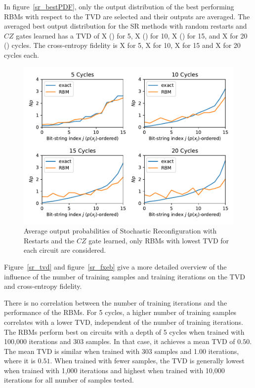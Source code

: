 In figure~\ref{sr_bestPDF}, only the output distribution of the best performing RBMs with respect to the 
TVD are selected and their outputs are averaged. The averaged best output distribution for the SR methods with 
random restarts and $CZ$ gates learned has a TVD of X () for 5, X () for 10, X () for 15, and X for 20 () 
cycles. The cross-entropy fidelity is X for 5, X for 10, X for 15 and X for 20 cycles each. 

\begin{figure}[H]
  \centering
  \includegraphics[width=\textwidth]{figures/results/SR-restarts-learned/avgBestPDF.pdf}
  \caption[Averaged best performing output probabilities of Stochastic Reconfiguration with Restarts Learned]{
    Average output probabilities of Stochastic Reconfiguration with Restarts and the $CZ$ gate learned, only RBMs with lowest
    TVD for each circuit are considered.}
  \label{fig:sr_bestPDF}
\end{figure}

Figure~\ref{sr_tvd} and figure~\ref{sr_fxeb} give a more detailed overview of the influence of the 
number of training samples and training iterations on the TVD and cross-entropy fidelity. 

There is no correlation between the number of training
iterations and the performance of the RBMs. For 5 cycles, a higher number of training samples correlates
with a lower TVD, independent of the number of training iterations. The RBMs perform best on 
circuits with a depth of 5 cycles when trained with 100,000 iterations and 303 samples. In that case, 
it achieves a mean TVD of $0.50$. The mean TVD is similar when trained with 303 samples and 1.00 iterations, 
where it is $0.51$. When trained with fewer samples, the TVD is generally lowest when trained with 1,000 
iterations and highest when trained with 10,000 iterations for all number of samples tested. 

